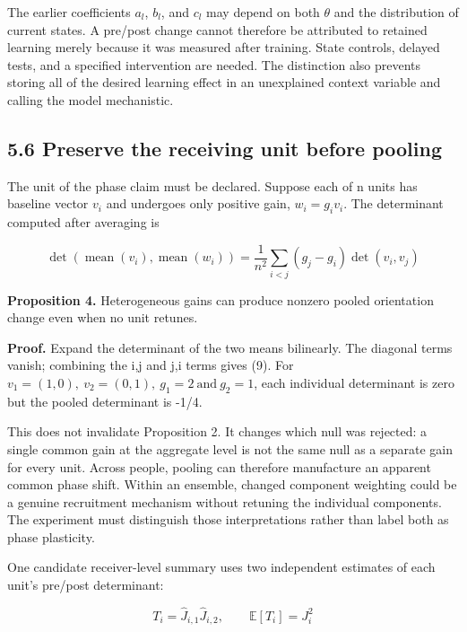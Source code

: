 \documentclass[
  american,
  11pt,
  letterpaper,
]{article}
\begin{document}
The earlier coefficients \(a_l\), \(b_l\), and \(c_l\) may depend on both \(\theta\) and the distribution of current states. A pre/post change cannot therefore be attributed to retained learning merely because it was measured after training. State controls, delayed tests, and a specified intervention are needed. The distinction also prevents storing all of the desired learning effect in an unexplained context variable and calling the model mechanistic.

\subsection{5.6 Preserve the receiving unit before pooling}\label{preserve-the-receiving-unit-before-pooling}

The unit of the phase claim must be declared. Suppose each of n units has baseline vector \(v_i\) and undergoes only positive gain, \(w_i=g_i v_i\). The determinant computed after averaging is

\begin{equation}
\det(\operatorname{mean}(v_i),\operatorname{mean}(w_i))=\frac{1}{n^2}\sum_{i<j}(g_j-g_i)\det(v_i,v_j)\tag{9}
\end{equation}

\textbf{Proposition 4.} Heterogeneous gains can produce nonzero pooled orientation change even when no unit retunes.

\textbf{Proof.} Expand the determinant of the two means bilinearly. The diagonal terms vanish; combining the i,j and j,i terms gives (9). For \(v_1=(1,0),\ v_2=(0,1),\ g_1=2\ \text{and}\ g_2=1\), each individual determinant is zero but the pooled determinant is -1/4.

This does not invalidate Proposition 2. It changes which null was rejected: a single common gain at the aggregate level is not the same null as a separate gain for every unit. Across people, pooling can therefore manufacture an apparent common phase shift. Within an ensemble, changed component weighting could be a genuine recruitment mechanism without retuning the individual components. The experiment must distinguish those interpretations rather than label both as phase plasticity.

One candidate receiver-level summary uses two independent estimates of each unit's pre/post determinant:

\begin{equation}
T_i=\widehat J_{i,1}\widehat J_{i,2},\qquad\mathbb E[T_i]=J_i^2\tag{10}
\end{equation}
\end{document}
